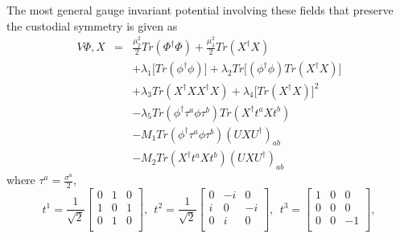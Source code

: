The most general gauge invariant potential involving these fields that preserve the custodial symmetry is given as
\begin{eqnarray}
    V{\Phi,X} & = & \frac{\mu_2^2}{2}Tr(\Phi^{\dagger}\Phi) + \frac{\mu_3^2}{2}Tr(X^{\dagger}X)  \nonumber \\
            & & + \lambda_1\Big[ Tr(\phi^\dagger \phi)\Big] + \lambda_2 Tr\Big[ (\phi^{\dagger} \phi) Tr(X^{\dagger}X) \Big] \nonumber \\
            & & + \lambda_3 Tr(X^{\dagger}XX^{\dagger}X) + \lambda_4 \Big[ Tr(X^{\dagger}X) \Big]^2  \nonumber \\
            & & -\lambda_5 Tr(\phi^{\dagger} \tau^a \phi \tau^b) Tr(X^{\dagger} t^a X t^b)   \nonumber \\
            & & -M_1 Tr(\phi^{\dagger} \tau^a \phi \tau^b) (UXU^{\dagger})_{ab} \nonumber \\
            & & -M_2 Tr(X^{\dagger} t^a X t^b)(UXU^{\dagger})_{ab}
\end{eqnarray}
where $\tau^a = \frac{\sigma^a}{2}$,
\begin{equation}
    t^1=\frac{1}{\sqrt{2}}
        \begin{bmatrix}
        0   &   1 & 0 \\
        1   &   0 & 1 \\
        0   &   1 & 0 \\
        \end{bmatrix},~~
    t^2 = \frac{1}{\sqrt{2}}
        \begin{bmatrix}
        0   &   -i & 0 \\
        i   &   0 & -i \\
        0   &   i & 0  \\
        \end{bmatrix},~~
    t^3 = 
        \begin{bmatrix}
        1   &   0 & 0 \\
        0   &   0 & 0 \\
        0   &   0 & -1   \\
        \end{bmatrix},
\end{equation}\

